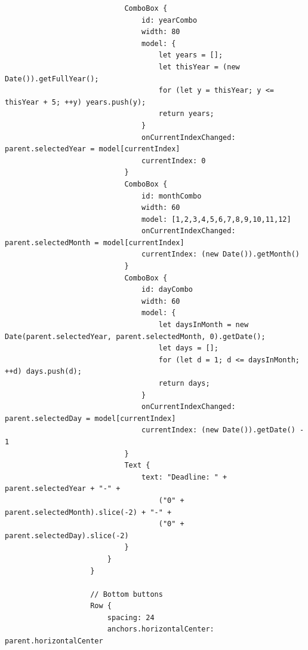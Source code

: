 \documentclass{report}
\begin{document}
\begin{lstlisting}
                            ComboBox {
                                id: yearCombo
                                width: 80
                                model: {
                                    let years = [];
                                    let thisYear = (new Date()).getFullYear();
                                    for (let y = thisYear; y <= thisYear + 5; ++y) years.push(y);
                                    return years;
                                }
                                onCurrentIndexChanged: parent.selectedYear = model[currentIndex]
                                currentIndex: 0
                            }
                            ComboBox {
                                id: monthCombo
                                width: 60
                                model: [1,2,3,4,5,6,7,8,9,10,11,12]
                                onCurrentIndexChanged: parent.selectedMonth = model[currentIndex]
                                currentIndex: (new Date()).getMonth()
                            }
                            ComboBox {
                                id: dayCombo
                                width: 60
                                model: {
                                    let daysInMonth = new Date(parent.selectedYear, parent.selectedMonth, 0).getDate();
                                    let days = [];
                                    for (let d = 1; d <= daysInMonth; ++d) days.push(d);
                                    return days;
                                }
                                onCurrentIndexChanged: parent.selectedDay = model[currentIndex]
                                currentIndex: (new Date()).getDate() - 1
                            }
                            Text {
                                text: "Deadline: " + parent.selectedYear + "-" +
                                    ("0" + parent.selectedMonth).slice(-2) + "-" +
                                    ("0" + parent.selectedDay).slice(-2)
                            }
                        }
                    }
    
                    // Bottom buttons
                    Row {
                        spacing: 24
                        anchors.horizontalCenter: parent.horizontalCenter
    

\end{lstlisting}
\end{document}
